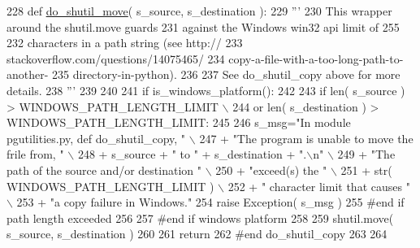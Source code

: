 \begin{DoxyCode}
228 \textcolor{keyword}{def }\hyperlink{namespacenegui_1_1pgutilities_a954873cfc5c675dc2e94e17931965ced}{do\_shutil\_move}( s\_source, s\_destination ):
229     \textcolor{stringliteral}{'''}
230 \textcolor{stringliteral}{    This wrapper around the shutil.move guards}
231 \textcolor{stringliteral}{    against the Windows win32 api limit of 255}
232 \textcolor{stringliteral}{    characters in a path string (see http://}
233 \textcolor{stringliteral}{    stackoverflow.com/questions/14075465/}
234 \textcolor{stringliteral}{    copy-a-file-with-a-too-long-path-to-another-}
235 \textcolor{stringliteral}{    directory-in-python).  }
236 \textcolor{stringliteral}{}
237 \textcolor{stringliteral}{    See do\_shutil\_copy above for more details.}
238 \textcolor{stringliteral}{    '''}
239 
240 
241     \textcolor{keywordflow}{if} is\_windows\_platform():
242 
243         \textcolor{keywordflow}{if} len( s\_source ) > WINDOWS\_PATH\_LENGTH\_LIMIT \(\backslash\)
244                 \textcolor{keywordflow}{or} len( s\_destination ) > WINDOWS\_PATH\_LENGTH\_LIMIT:
245 
246             s\_msg=\textcolor{stringliteral}{"In module pgutilities.py, def do\_shutil\_copy, "} \(\backslash\)
247                         + \textcolor{stringliteral}{"The program is unable to move the frile from, "} \(\backslash\)
248                         + s\_source + \textcolor{stringliteral}{" to "} + s\_destination + \textcolor{stringliteral}{".\(\backslash\)n"} \(\backslash\)
249                         + \textcolor{stringliteral}{"The path of the source and/or destination "} \(\backslash\)
250                         + \textcolor{stringliteral}{"exceed(s) the "} \(\backslash\)
251                         + str( WINDOWS\_PATH\_LENGTH\_LIMIT )  \(\backslash\)
252                         + \textcolor{stringliteral}{" character  limit that causes "} \(\backslash\)
253                         + \textcolor{stringliteral}{"a copy failure in Windows."}  
254             \textcolor{keywordflow}{raise} Exception( s\_msg )
255         \textcolor{comment}{#end if path length exceeded}
256         
257     \textcolor{comment}{#end if windows platform}
258 
259     shutil.move( s\_source, s\_destination )
260 
261     \textcolor{keywordflow}{return}
262 \textcolor{comment}{#end do\_shutil\_copy}
263 
264 
\end{DoxyCode}
